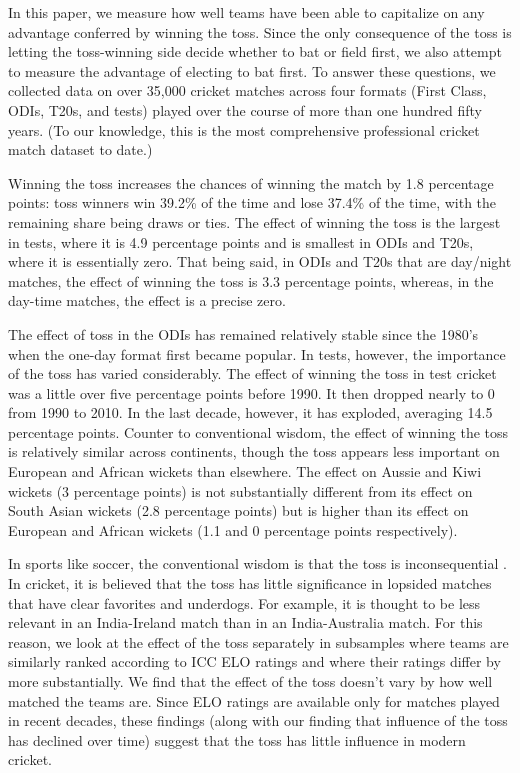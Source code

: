 \documentclass[11pt,  letterpaper]{article}
\begin{document}
In this paper, we measure how well teams have been able to capitalize on any advantage conferred by winning the toss. Since the only consequence of the toss is letting the toss-winning side decide whether to bat or field first, we also attempt to measure the advantage of electing to bat first. To answer these questions, we collected data on over 35,000 cricket matches across four formats (First Class, ODIs, T20s, and tests) played over the course of more than one hundred fifty years. (To our knowledge, this is the most comprehensive professional cricket match dataset to date.)

Winning the toss increases the chances of winning the match by 1.8 percentage points: toss winners win 39.2\% of the time and lose 37.4\% of the time, with the remaining share being draws or ties. The effect of winning the toss is the largest in tests, where it is 4.9 percentage points and is smallest in ODIs and T20s, where it is essentially zero. That being said, in ODIs and T20s that are day/night matches, the effect of winning the toss is 3.3 percentage points, whereas, in the day-time matches, the effect is a precise zero.

The effect of toss in the ODIs has remained relatively stable since the 1980's when the one-day format first became popular. In tests, however, the importance of the toss has varied considerably. The effect of winning the toss in test cricket was a little over five percentage points before 1990. It then dropped nearly to 0 from 1990 to 2010. In the last decade, however, it has exploded, averaging 14.5 percentage points. Counter to conventional wisdom, the effect of winning the toss is relatively similar across continents, though the toss appears less important on European and African wickets than elsewhere. The effect on Aussie and Kiwi wickets (3 percentage points) is not substantially different from its effect on South Asian wickets (2.8 percentage points) but is higher than its effect on European and African wickets (1.1 and 0 percentage points respectively).

In sports like soccer, the conventional wisdom is that the toss is inconsequential \citep{csato2020comparison}. In cricket, it is believed that the toss has little significance in lopsided matches that have clear favorites and underdogs. For example, it is thought to be less relevant in an India-Ireland match than in an India-Australia match. For this reason, we look at the effect of the toss separately in subsamples where teams are similarly ranked according to ICC ELO ratings and where their ratings differ by more substantially. We find that the effect of the toss doesn't vary by how well matched the teams are. Since ELO ratings are available only for matches played in recent decades, these findings (along with our finding that influence of the toss has declined over time) suggest that the toss has little influence in modern cricket.
\end{document}
